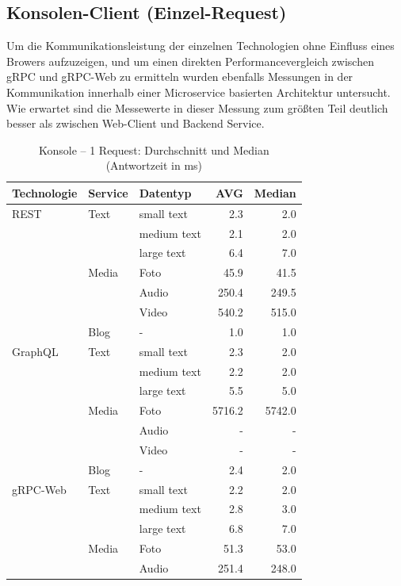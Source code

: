 \clearpage
\subsection{Konsolen-Client (Einzel-Request)}
Um die Kommunikationsleistung der einzelnen Technologien ohne Einfluss eines Browers aufzuzeigen, und um einen direkten Performancevergleich zwischen gRPC und gRPC-Web zu ermitteln wurden ebenfalls Messungen in der Kommunikation innerhalb einer Microservice basierten Architektur untersucht. Wie erwartet sind die Messewerte in dieser Messung zum größten Teil deutlich besser als zwischen Web-Client und Backend Service.  

\begin{table}[h]
	\centering
	\caption{Konsole – 1 Request: Durchschnitt und Median (Antwortzeit in ms)}
	\label{tab:console-1req}
	\renewcommand{\arraystretch}{1.1}
	\begin{tabular}{|l|l|l|r|r|}
		\hline
		\textbf{Technologie} & \textbf{Service} & \textbf{Datentyp} & \textbf{AVG} & \textbf{Median} \\
		\hline
		REST & Text  & small text  & 2.3 & 2.0 \\
		&       & medium text & 2.1 & 2.0 \\
		&       & large text  & 6.4 & 7.0 \\
		& Media & Foto        & 45.9 & 41.5 \\
		&       & Audio       & 250.4 & 249.5 \\
		&       & Video       & 540.2 & 515.0 \\
		& Blog  & -           & 1.0 & 1.0 \\
		\hline
		GraphQL & Text  & small text  & 2.3 & 2.0 \\
		&       & medium text & 2.2 & 2.0 \\
		&       & large text  & 5.5 & 5.0 \\
		& Media & Foto        & 5716.2 & 5742.0 \\
		&       & Audio       & - & - \\
		&       & Video       & - & - \\
		& Blog  & -           & 2.4 & 2.0 \\
		\hline
		gRPC-Web & Text  & small text  & 2.2 & 2.0 \\
		&       & medium text & 2.8 & 3.0 \\
		&       & large text  & 6.8 & 7.0 \\
		& Media & Foto        & 51.3 & 53.0 \\
		&       & Audio       & 251.4 & 248.0 \\

\end{tabular}
\end{table}
